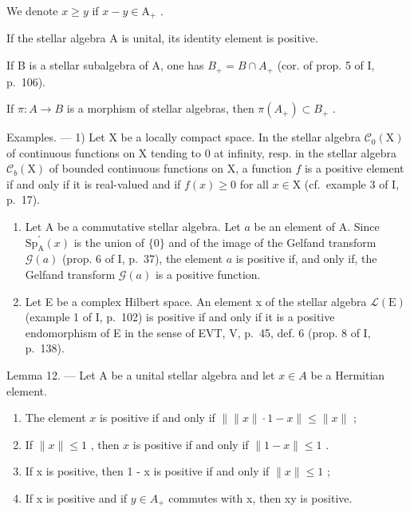 We denote \(x \geqslant y\) if \(x - y \in \mathrm{A}_{+}\) .

If the stellar algebra A is unital, its identity element is positive.

If B is a stellar subalgebra of A, one has \(B_{+} = B \cap A_{+}\) (cor. of prop. 5 of I, p.~106).

If \(\pi\colon A\to B\) is a morphism of stellar algebras, then \(\pi(A_{+})\subset B_{+}\) .

Examples. --- 1) Let X be a locally compact space. In the stellar algebra \(\mathcal{C}_{0}(\mathrm{X})\) of continuous functions on X tending to 0 at infinity, resp. in the stellar algebra \(\mathcal{C}_{b}(\mathrm{X})\) of bounded continuous functions on X, a function \(f\) is a positive element if and only if it is real-valued and if \(f(x) \geqslant 0\) for all \(x \in \mathrm{X}\) (cf.~example 3 of I, p.~17).

\begin{enumerate}
\def\labelenumi{\arabic{enumi})}
\setcounter{enumi}{1}
\item
  Let A be a commutative stellar algebra. Let \(a\) be an element of A. Since \(\mathrm{Sp}_{\mathrm{A}}^{\prime}(x)\) is the union of \(\{0\}\) and of the image of the Gelfand transform \(\mathcal{G}(a)\) (prop. 6 of I, p.~37), the element \(a\) is positive if, and only if, the Gelfand transform \(\mathcal{G}(a)\) is a positive function.
\item
  Let E be a complex Hilbert space. An element x of the stellar algebra \(\mathcal{L}(\mathrm{E})\) (example 1 of I, p.~102) is positive if and only if it is a positive endomorphism of E in the sense of EVT, V, p.~45, def. 6 (prop. 8 of I, p.~138).
\end{enumerate}

Lemma 12. --- Let A be a unital stellar algebra and let \(x \in A\) be a Hermitian element.

\begin{enumerate}
\def\labelenumi{\alph{enumi})}
\item
  The element \(x\) is positive if and only if \(\left\| \|x\| \cdot 1 - x \right\| \leqslant \|x\|\) ;
\item
  If \(\| x\| \leqslant 1\) , then \(x\) is positive if and only if \(\| 1 - x\| \leqslant 1\) .
\item
  If x is positive, then 1 - x is positive if and only if \(\|x\| \leqslant 1\) ;
\item
  If x is positive and if \(y \in A_{+}\) commutes with x, then xy is positive.
\end{enumerate}

